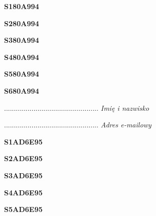 \begin{turn}{90}\huge \textbf{S180A994}\end{turn}

\begin{turn}{90}\huge \textbf{S280A994}\end{turn}

\begin{turn}{90}\huge \textbf{S380A994}\end{turn}

\begin{turn}{90}\huge \textbf{S480A994}\end{turn}

\begin{turn}{90}\huge \textbf{S580A994}\end{turn}

\begin{turn}{90}\huge \textbf{S680A994}\end{turn}

\begin{turn}{90}\begin{minipage}{\linewidth} \vspace{20mm} ................................................  \textit{Imię i nazwisko}\end{minipage}\end{turn}

\begin{turn}{90}\begin{minipage}{\linewidth} \vspace{20mm} ................................................  \textit{Adres e-mailowy}\end{minipage}\end{turn}

\begin{turn}{90}\huge \textbf{S1AD6E95}\end{turn}

\begin{turn}{90}\huge \textbf{S2AD6E95}\end{turn}

\begin{turn}{90}\huge \textbf{S3AD6E95}\end{turn}

\begin{turn}{90}\huge \textbf{S4AD6E95}\end{turn}

\begin{turn}{90}\huge \textbf{S5AD6E95}\end{turn}

